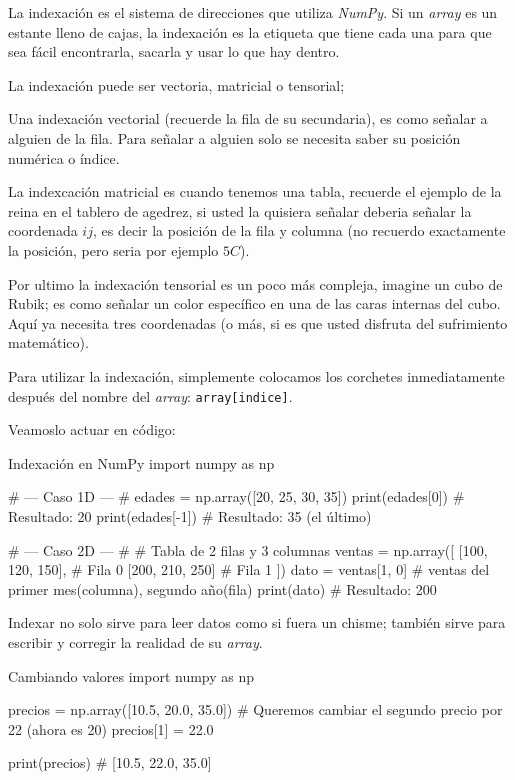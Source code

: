 La indexación es el sistema de direcciones que utiliza \textit{NumPy}. Si un \textit{array} es un estante lleno de cajas, la indexación es la etiqueta que tiene cada una para que sea fácil encontrarla, sacarla y usar lo que hay dentro.

La indexación puede ser vectoria, matricial o tensorial;

Una indexación vectorial (recuerde la fila de su secundaria), es como señalar a alguien de la fila. Para señalar a alguien solo se necesita saber su posición numérica o índice. 

La indexcación matricial es cuando tenemos una tabla, recuerde el ejemplo de la reina en el tablero de agedrez, si usted la quisiera señalar deberia señalar la coordenada \(ij\), es decir la posición de la fila y columna (no recuerdo exactamente la posición, pero seria por ejemplo \(5C\)).

Por ultimo la indexación tensorial es un poco más compleja, imagine un cubo de Rubik; es como señalar un color específico en una de las caras internas del cubo. Aquí ya necesita tres coordenadas (o más, si es que usted disfruta del sufrimiento matemático).

Para utilizar la indexación, simplemente colocamos los corchetes inmediatamente después del nombre del \textit{array}: \texttt{array[indice]}.

Veamoslo actuar en código:

\begin{pycode}{Indexación en NumPy}
import numpy as np

# --- Caso 1D --- #
edades = np.array([20, 25, 30, 35])
print(edades[0])  # Resultado: 20
print(edades[-1]) # Resultado: 35 (el último)

# --- Caso 2D --- #
# Tabla de 2 filas y 3 columnas
ventas = np.array([
    [100, 120, 150], # Fila 0
    [200, 210, 250]  # Fila 1
    ])
dato = ventas[1, 0] # ventas del primer mes(columna), segundo año(fila)
print(dato) # Resultado: 200
\end{pycode}

Indexar no solo sirve para leer datos como si fuera un chisme; también sirve para escribir y corregir la realidad de su \textit{array}.

\begin{pycode}{Cambiando valores}
import numpy as np

precios = np.array([10.5, 20.0, 35.0])
# Queremos cambiar el segundo precio por 22 (ahora es 20)
precios[1] = 22.0

print(precios) # [10.5, 22.0, 35.0]
\end{pycode}

